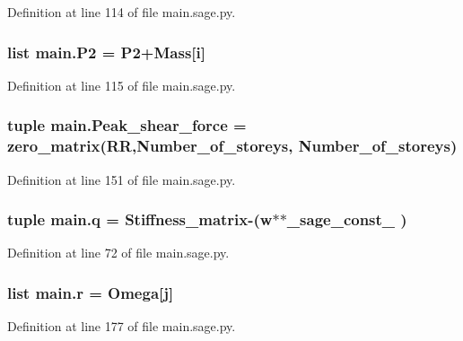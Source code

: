 Definition at line 114 of file main.\+sage.\+py.

\hypertarget{a00039_a1b83b7a3849a8e1c84b9906c45625fec}{}
\subsubsection[{P2}]{\setlength{\rightskip}{0pt plus 5cm}list main.\+P2 = P2+Mass\mbox{[}{\bf i}\mbox{]}}\label{a00039_a1b83b7a3849a8e1c84b9906c45625fec}


Definition at line 115 of file main.\+sage.\+py.

\hypertarget{a00039_a6461376590c833b81e5920e96ed3d5bf}{}
\subsubsection[{Peak\+\_\+shear\+\_\+force}]{\setlength{\rightskip}{0pt plus 5cm}tuple main.\+Peak\+\_\+shear\+\_\+force = zero\+\_\+matrix(R\+R,Number\+\_\+of\+\_\+storeys, Number\+\_\+of\+\_\+storeys)}\label{a00039_a6461376590c833b81e5920e96ed3d5bf}


Definition at line 151 of file main.\+sage.\+py.

\hypertarget{a00039_a1787a37505189f764069a45071189112}{}
\subsubsection[{q}]{\setlength{\rightskip}{0pt plus 5cm}tuple main.\+q = {\bf Stiffness\+\_\+matrix}-\/({\bf w}$\ast$$\ast${\bf \+\_\+sage\+\_\+const\+\_} )}\label{a00039_a1787a37505189f764069a45071189112}


Definition at line 72 of file main.\+sage.\+py.

\hypertarget{a00039_a4760f4121f66000c5570f75176649cb8}{}
\subsubsection[{r}]{\setlength{\rightskip}{0pt plus 5cm}list main.\+r = {\bf Omega}\mbox{[}{\bf j}\mbox{]}}\label{a00039_a4760f4121f66000c5570f75176649cb8}


Definition at line 177 of file main.\+sage.\+py.

\hypertarget{a00039_a01374e7fea2c00172c845c7a5c71cfae}{}
